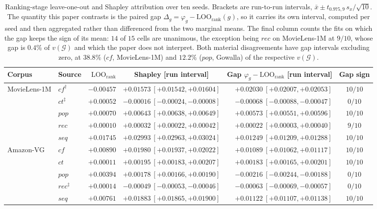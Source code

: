 \documentclass[pdflatex,sn-basic,Numbered]{sn-jnl}
\theoremstyle{plain}
\theoremstyle{definition}
\newcommand{\G}{\mathcal{G}}
\newcommand{\LOOr}{\mathrm{LOO}_{\mathrm{rank}}}
\begin{document}
\begin{table}[tbp]
\caption{Ranking-stage leave-one-out and Shapley attribution over ten seeds.
Brackets are run-to-run intervals, $\bar x \pm t_{0.975,9}\,s_x/\sqrt{10}$.
The quantity this paper contrasts is the paired gap
$\Delta_g = \varphi_g - \LOOr(g)$, so it carries its own interval, computed
per seed and then aggregated rather than differenced from the two marginal
means. The final column counts the fits on which the gap keeps the sign of its
mean: $14$ of $15$ cells are unanimous, the exception being $rec$ on
MovieLens-1M at $9/10$, whose gap is $0.4\%$ of $v(\G)$ and which the paper
does not interpret. Both material disagreements have gap intervals excluding
zero, at $38.8\%$ ($cf$, MovieLens-1M) and $12.2\%$ ($pop$, Gowalla) of the
respective $v(\G)$.}
\label{tab:loo}
\small
\setlength{\tabcolsep}{2.5pt}
\begin{tabular}{@{}llrcrc@{}}
\toprule
Corpus & Source & $\LOOr$ & Shapley [run interval]
       & Gap $\varphi_g-\LOOr$ [run interval] & Gap sign \\
\midrule
MovieLens-1M & $cf^{\dagger}$ & $-0.00457$ & $+0.01573\ [+0.01542,+0.01604]$ & $+0.02030\ [+0.02007,+0.02053]$ & $10/10$ \\
             & $ct^{\ddagger}$ & $+0.00052$ & $-0.00016\ [-0.00024,-0.00008]$ & $-0.00068\ [-0.00088,-0.00047]$ & $0/10$ \\
             & $pop$ & $+0.00070$ & $+0.00643\ [+0.00638,+0.00649]$ & $+0.00573\ [+0.00551,+0.00596]$ & $10/10$ \\
             & $rec$ & $+0.00010$ & $+0.00032\ [+0.00022,+0.00042]$ & $+0.00022\ [+0.00003,+0.00040]$ & $9/10$ \\
             & $seq$ & $+0.01745$ & $+0.02993\ [+0.02963,+0.03024]$ & $+0.01249\ [+0.01209,+0.01288]$ & $10/10$ \\
\midrule
Amazon-VG    & $cf$ & $+0.00890$ & $+0.01980\ [+0.01937,+0.02022]$ & $+0.01089\ [+0.01062,+0.01117]$ & $10/10$ \\
             & $ct$ & $+0.00011$ & $+0.00195\ [+0.00183,+0.00207]$ & $+0.00183\ [+0.00165,+0.00201]$ & $10/10$ \\
             & $pop$ & $+0.00394$ & $+0.00178\ [+0.00166,+0.00190]$ & $-0.00216\ [-0.00244,-0.00188]$ & $0/10$ \\
             & $rec^{\ddagger}$ & $+0.00014$ & $-0.00049\ [-0.00053,-0.00046]$ & $-0.00063\ [-0.00069,-0.00057]$ & $0/10$ \\
             & $seq$ & $+0.00761$ & $+0.01883\ [+0.01865,+0.01900]$ & $+0.01122\ [+0.01107,+0.01138]$ & $10/10$ \\

\end{tabular}
\end{table}
\end{document}
